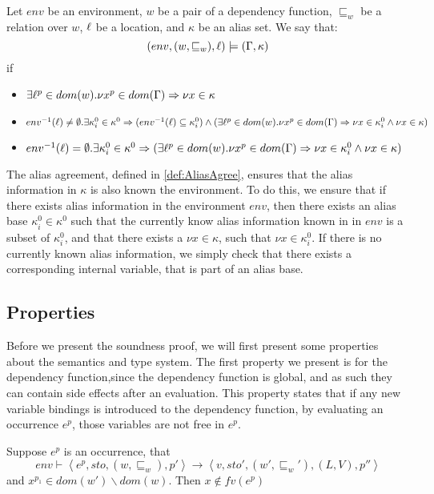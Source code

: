 \documentclass[acmsmall,sigplan]{acmart}
\begin{document}
\begin{definition}\label{def:AliasAgree}
	Let $env$ be an environment, $w$ be a pair of a dependency function, $\sqsubseteq_w$ be a relation over $w$, $\ell$ be a location, and $\kappa$ be an alias set.
	We say that:
	$$(env,(w,\sqsubseteq_w),\ell)\models(\Gamma,\kappa)$$
	if
	\begin{itemize}
		\item $\exists \ell^p\in dom(w).\nu x^p\in dom(\Gamma)\Rightarrow\nu x\in\kappa$
		\item $env^{-1}(\ell)\neq\emptyset.\exists \kappa^0_i\in\kappa^0\Rightarrow
			(env^{-1}(\ell)\subseteq\kappa^0_i)\wedge(\exists \ell^p\in dom(w).\nu x^p\in dom(\Gamma)\Rightarrow\\\nu x\in\kappa^0_i\wedge\nu x\in\kappa)$
		\item $env^{-1}(\ell)=\emptyset.\exists \kappa^0_i\in\kappa^0\Rightarrow
			(\exists \ell^p\in dom(w).\nu x^p\in dom(\Gamma)\Rightarrow\nu x\in\kappa^0_i\wedge\nu x\in\kappa)$
	\end{itemize}
\end{definition}

The alias agreement, defined in \cref{def:AliasAgree}, ensures that the alias information in $\kappa$ is also known the environment.
To do this, we ensure that if there exists alias information in the environment $env$, then there exists an alias base $\kappa^0_i\in\kappa^0$ such that the currently know alias information known in 
in $env$ is a subset of $\kappa^0_i$, and that there exists a $\nu x\in\kappa$, such that $\nu x\in \kappa^0_i$.
If there is no currently known alias information, we simply check that there exists a corresponding internal variable, that is part of an alias base.

\subsection{Properties}
Before we present the soundness proof, we will first present some properties about the semantics and type system.
The first property we present is for the dependency function,since the dependency function is global, and as such they can contain side effects after an evaluation.
This property states that if any new variable bindings is introduced to the dependency function, by evaluating an occurrence $e^p$, those variables are not free in $e^p$.

\begin{lemma}[History]\label{lemma:His}
	Suppose $e^p$ is an occurrence, that
	$$env\vdash\left\langle e^{p},sto,(w,\sqsubseteq_w),p'\right\rangle\rightarrow\left\langle v,sto',(w',\sqsubseteq_w'),(L,V),p''\right\rangle$$
		and $x^{p_1}\in dom(w')\backslash dom(w)$.
		Then $x\notin fv(e^{p})$
\end{lemma}
\end{document}
